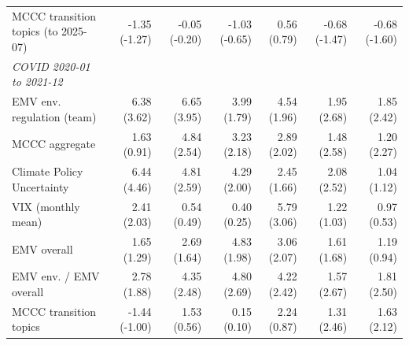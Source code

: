 \begin{table}[htbp]
\begin{tabular}{lrrrrrr}
MCCC transition topics (to 2025-07) & -1.35 (-1.27) & -0.05 (-0.20) & -1.03 (-0.65) & 0.56 (0.79) & -0.68 (-1.47) & -0.68 (-1.60) \\
\textit{COVID 2020-01 to 2021-12} &  &  &  &  &  &  \\
EMV env. regulation (team) & 6.38 (3.62) & 6.65 (3.95) & 3.99 (1.79) & 4.54 (1.96) & 1.95 (2.68) & 1.85 (2.42) \\
MCCC aggregate & 1.63 (0.91) & 4.84 (2.54) & 3.23 (2.18) & 2.89 (2.02) & 1.48 (2.58) & 1.20 (2.27) \\
Climate Policy Uncertainty & 6.44 (4.46) & 4.81 (2.59) & 4.29 (2.00) & 2.45 (1.66) & 2.08 (2.52) & 1.04 (1.12) \\
VIX (monthly mean) & 2.41 (2.03) & 0.54 (0.49) & 0.40 (0.25) & 5.79 (3.06) & 1.22 (1.03) & 0.97 (0.53) \\
EMV overall & 1.65 (1.29) & 2.69 (1.64) & 4.83 (1.98) & 3.06 (2.07) & 1.61 (1.68) & 1.19 (0.94) \\
EMV env. / EMV overall & 2.78 (1.88) & 4.35 (2.48) & 4.80 (2.69) & 4.22 (2.42) & 1.57 (2.67) & 1.81 (2.50) \\
MCCC transition topics & -1.44 (-1.00) & 1.53 (0.56) & 0.15 (0.10) & 2.24 (0.87) & 1.31 (2.46) & 1.63 (2.12) \\
\bottomrule
\end{tabular}
\end{table}
